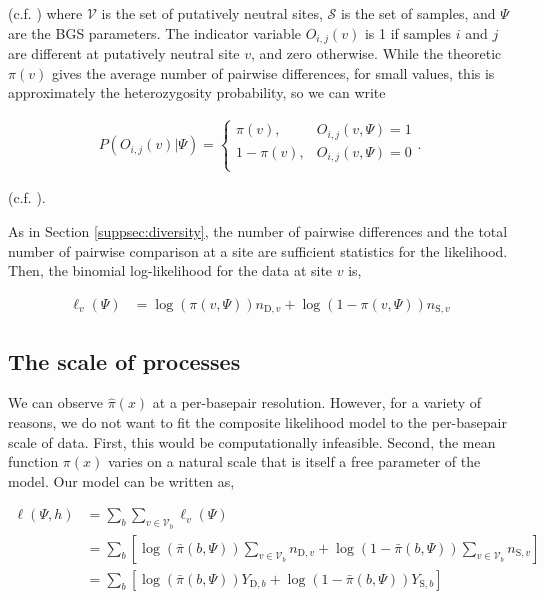 \documentclass[11pt]{article}
\begin{document}
(c.f. \cite{McVicker2009-ax,Elyashiv2016-vt,Murphy2022-sj}) where $\mathcal{V}$
is the set of putatively neutral sites, $\mathcal{S}$ is the set of samples,
and $\Psi$ are the BGS parameters. The indicator variable $O_{i,j}(v)$ is 1 if
samples $i$ and $j$ are different at putatively neutral site $v$, and zero
otherwise. While the theoretic $\pi(v)$ gives the average number of pairwise
differences, for small values, this is approximately the heterozygosity
probability, so we can write

\begin{align}
  P(O_{i,j}(v) | \Psi) = 
    \begin{cases}
      \pi(v), & O_{i,j}(v, \Psi) = 1 \\
      1-\pi(v), & O_{i,j}(v, \Psi) = 0 \\
    \end{cases}.
\end{align}

(c.f. \cite{Elyashiv2016-vt}). 

As in Section \ref{suppsec:diversity}, the number of pairwise differences and
the total number of pairwise comparison at a site are sufficient statistics for
the likelihood. Then, the binomial log-likelihood for the data at site $v$ is,

\begin{align}
  \ell_v(\Psi) &= \log(\pi(v, \Psi)) n_{\text{D},v} + \log(1-\pi(v, \Psi)) n_{\text{S},{v}}
\end{align}

\subsection{The scale of processes}

We can observe $\widehat{\pi}(x)$ at a per-basepair resolution. However, for a
variety of reasons, we do not want to fit the composite likelihood model to the
per-basepair scale of data. First, this would be computationally infeasible.
Second, the mean function $\pi(x)$ varies on a natural scale that is itself a
free parameter of the model. Our model can be written as, 

\begin{align}
  \ell(\Psi, h) &= \sum_{b} \sum_{v \in \mathcal{V}_b} \ell_v(\Psi) \\
             &= \sum_{b} \left[\log(\bar{\pi}(b, \Psi)) \sum_{v \in \mathcal{V}_b} n_{\text{D},v} + \log(1-\bar{\pi}(b, \Psi)) \sum_{v \in \mathcal{V}_b} n_{\text{S},{v}}\right] \\
             &= \sum_{b} \left[\log(\bar{\pi}(b, \Psi)) Y_{\text{D},b} + \log(1-\bar{\pi}(b, \Psi)) Y_{\text{S},{b}}\right] \\
\end{align}
\end{document}
